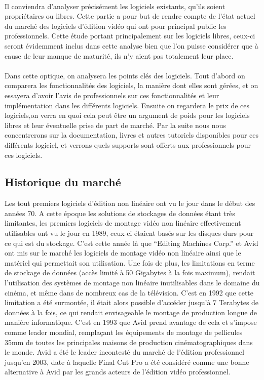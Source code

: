\paragraph{}

Il conviendra d'analyser précisément les logiciels existants, qu'ils soient
propriétaires ou libres. Cette partie a pour but de rendre compte de
l'état actuel du marché des logiciels d'édition vidéo qui ont pour principal
public les professionnels. Cette étude portant principalement
sur les logiciels libres, ceux-ci seront évidemment inclus dans cette analyse
bien que l'on puisse considérer que à cause de leur manque de maturité, ils
n'y aient pas totalement leur place.

\paragraph{}

Dans cette optique, on analysera les points clés des logiciels.
Tout d'abord on comparera les fonctionnalités des
logiciels, la manière dont elles sont gérées, et on essayera d'avoir l'avis de
professionnels sur ces fonctionnalités et leur implémentation dans les différents
logiciels. Ensuite on regardera le prix de ces logiciels,on verra en quoi cela
peut être un argument de poids pour les logiciels libres et leur éventuelle
prise de part de marché. Par la suite nous nous concentrerons sur la documentation,
livres et autres tutoriels disponibles pour ces différents logiciel, et verrons
quels supports sont offerts aux professionnels pour ces logiciels.

\subsection {Historique du marché}

Les tout premiers logiciels d'édition non linéaire ont vu le jour dans le début des années 70.
A cette époque les solutions de stockages de données étant très limitantes, les premiers logiciels de montage
vidéo non linéaire effectivement utilisables ont vu le jour en 1989, ceux-ci étaient basés sur les disques durs
pour ce qui est du stockage. C'est cette année là que ``Editing Machines Corp.'' et Avid ont mis sur le
marché les logiciels de montage vidéo non linéaire ainsi que le matériel qui permettait son
utilisation. Une fois de plus, les limitations en terme de stockage de données (accès limité à 50 Gigabytes
à la fois maximum), rendait l'utilisation des systèmes de montage non linéaire inutilisables dans le domaine
du cinéma, et même dans de nombreux cas de la télévision. C'est en 1992 que cette limitation a été surmontée,
il était alors possible d'accéder jusqu'à 7 Terabytes de données à la fois, ce qui rendait envisageable le montage
de production longue de manière informatique. C'est en 1993 que Avid prend avantage de cela et s'impose
comme leader mondial, remplaçant les équipements de montage de pellicules 35mm de toutes les principales maisons
de production cinématographiques dans le monde. Avid a été le leader incontesté du marché de l'édition
professionnel jusqu'en 2003, date à laquelle Final Cut Pro a été considéré comme une bonne alternative
à Avid par les grands acteurs de l'édition vidéo professionnel.


